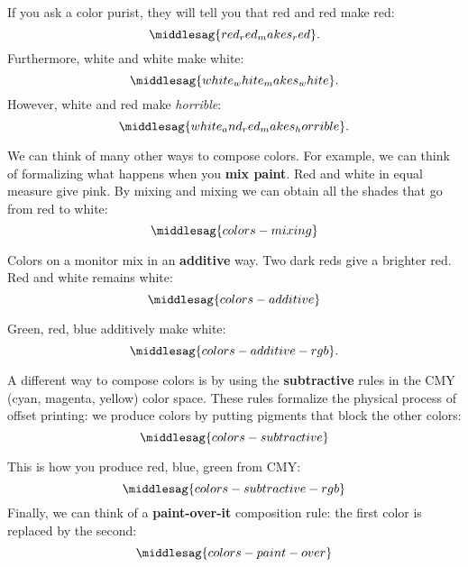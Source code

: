 If you ask a color purist, they will tell you that red and red make red:
%
\begin{equation}
    \middlesag{red_red_makes_red}.
\end{equation}
%
Furthermore, white and white make white:
%
\begin{equation}
    \middlesag{white_white_makes_white}.
\end{equation}
%
However, white and red make \emph{horrible}:
%
\begin{equation}
    \middlesag{white_and_red_makes_horrible}.
\end{equation}


We can think of many other ways to compose colors.
For example, we can think of formalizing what happens when you \textbf{mix paint}.
Red and white in equal measure give pink.
By mixing and mixing we can obtain all the shades that go from red to white:
%
\begin{equation}
    \label{eq:colors-mixing}
    \middlesag{colors-mixing}
\end{equation}

Colors on a monitor mix in an \textbf{additive} way.
Two dark reds give a brighter red.
Red and white remains white:
%
\begin{equation}
    \label{eq:colors-additive}
    \middlesag{colors-additive}
\end{equation}

Green, red, blue additively make white:
%
\begin{equation}
    \label{eq:colors-additive-rgb}
    \middlesag{colors-additive-rgb}.
\end{equation}

A different way to compose colors is by using the \textbf{subtractive} rules in the CMY (cyan, magenta, yellow) color space.
These rules formalize the physical process of offset printing: we produce colors by putting pigments that block the other colors:
%
\begin{equation}
    \label{eq:colors_subtractive}
    \middlesag{colors-subtractive}
\end{equation}

This is how you produce red, blue, green from CMY:
%
\begin{equation}
    \label{eq:colors-subtractive-rgb}
    \middlesag{colors-subtractive-rgb}
\end{equation}
%
Finally, we can think of a \textbf{paint-over-it} composition rule: the first color is replaced by the second:
%
\begin{equation}
    \label{eq:colors-paint-over}
    \middlesag{colors-paint-over}
\end{equation}


